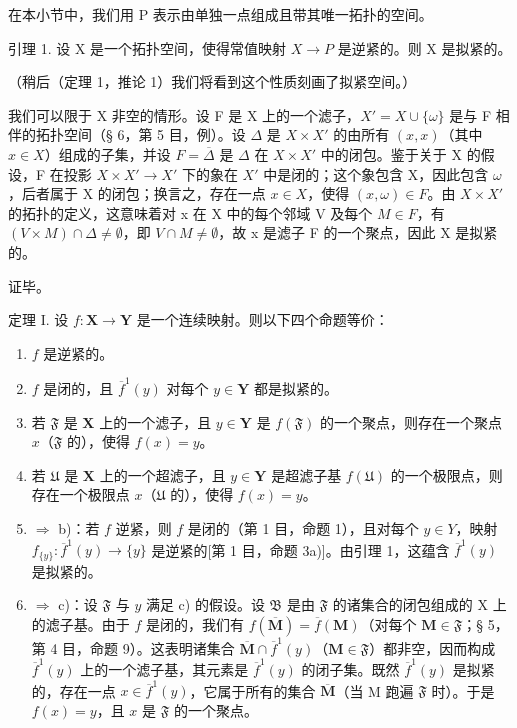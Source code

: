 在本小节中，我们用 P 表示由单独一点组成且带其唯一拓扑的空间。

引理 1. 设 X 是一个拓扑空间，使得常值映射 \(X \rightarrow P\) 是逆紧的。则 X 是拟紧的。

（稍后（定理 1，推论 1）我们将看到这个性质刻画了拟紧空间。）

我们可以限于 X 非空的情形。设 F 是 X 上的一个滤子，\(X' = X \cup \{\omega\}\) 是与 F 相伴的拓扑空间（§ 6，第 5 目，例）。设 \(\Delta\) 是 \(X \times X'\) 的由所有 \((x, x)\)（其中 \(x \in X\)）组成的子集，并设 \(F = \overline{\Delta}\) 是 \(\Delta\) 在 \(X \times X'\) 中的闭包。鉴于关于 X 的假设，F 在投影 \(X \times X' \to X'\) 下的象在 \(X'\) 中是闭的；这个象包含 X，因此包含 \(\omega\)，后者属于 X 的闭包；换言之，存在一点 \(x \in X\)，使得 \((x, \omega) \in F\)。由 \(X \times X'\) 的拓扑的定义，这意味着对 x 在 X 中的每个邻域 V 及每个 \(M \in F\)，有 \((V \times M) \cap \Delta \neq \emptyset\)，即 \(V \cap M \neq \emptyset\)，故 x 是滤子 F 的一个聚点，因此 X 是拟紧的。

证毕。

定理 I. 设 \(f: \mathbf{X} \to \mathbf{Y}\) 是一个连续映射。则以下四个命题等价：

\begin{enumerate}
\def\labelenumi{\alph{enumi})}
\item
  \(f\) 是逆紧的。
\item
  \(f\) 是闭的，且 \(\overline{f}^1(y)\) 对每个 \(y \in \mathbf{Y}\) 都是拟紧的。
\item
  若 \(\mathfrak{F}\) 是 \(\mathbf{X}\) 上的一个滤子，且 \(y\in \mathbf{Y}\) 是 \(f(\mathfrak{F})\) 的一个聚点，则存在一个聚点 \(x\)（\(\mathfrak{F}\) 的），使得 \(f(x) = y\)。
\item
  若 \(\mathfrak{U}\) 是 \(\mathbf{X}\) 上的一个超滤子，且 \(y\in \mathbf{Y}\) 是超滤子基 \(f(\mathfrak{U})\) 的一个极限点，则存在一个极限点 \(x\)（\(\mathfrak{U}\) 的），使得 \(f(x) = y\)。
\item
  \(\Longrightarrow\) b)：若 \(f\) 逆紧，则 \(f\) 是闭的（第 1 目，命题 1），且对每个 \(y \in Y\)，映射 \(f_{\{y\}}: \overline{f}^1(y) \to \{y\}\) 是逆紧的{[}第 1 目，命题 3a){]}。由引理 1，这蕴含 \(\overline{f}^1(y)\) 是拟紧的。
\item
  \(\Longrightarrow\) c)：设 \(\mathfrak{F}\) 与 \(y\) 满足 c) 的假设。设 \(\mathfrak{B}\) 是由 \(\mathfrak{F}\) 的诸集合的闭包组成的 X 上的滤子基。由于 \(f\) 是闭的，我们有 \(f(\overline{\mathbf{M}}) = \overline{f}(\mathbf{M})\)（对每个 \(\mathbf{M} \in \mathfrak{F}\)；§ 5，第 4 目，命题 9）。这表明诸集合 \(\overline{\mathbf{M}} \cap \overline{f}^1(y)\)（\(\mathbf{M} \in \mathfrak{F}\)）都非空，因而构成 \(\overline{f}^1(y)\) 上的一个滤子基，其元素是 \(\overline{f}^1(y)\) 的闭子集。既然 \(\overline{f}^1(y)\) 是拟紧的，存在一点 \(x \in \overline{f}^1(y)\)，它属于所有的集合 \(\overline{\mathbf{M}}\)（当 M 跑遍 \(\mathfrak{F}\) 时）。于是 \(f(x) = y\)，且 \(x\) 是 \(\mathfrak{F}\) 的一个聚点。
\end{enumerate}

